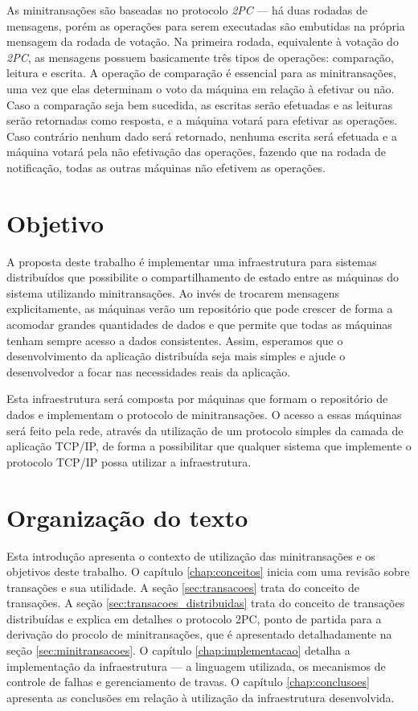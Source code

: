 \documentclass[11pt,twoside,a4paper]{book}
\begin{document}
As minitransações são baseadas no protocolo \emph{2PC} --- há duas rodadas de mensagens, porém as operações para serem executadas são embutidas na própria mensagem da rodada de votação. Na primeira rodada, equivalente à votação do \emph{2PC}, as mensagens possuem basicamente três tipos de operações: comparação, leitura e escrita. A operação de comparação é essencial para as minitransações, uma vez que elas determinam o voto da máquina em relação à efetivar ou não. Caso a comparação seja bem sucedida, as escritas serão efetuadas e as leituras serão retornadas como resposta, e a máquina votará para efetivar as operações. Caso contrário nenhum dado será retornado, nenhuma escrita será efetuada e a máquina votará pela não efetivação das operações, fazendo que na rodada de notificação, todas as outras máquinas não efetivem as operações.

\section{Objetivo}
\label{sec:objetivo}
A proposta deste trabalho é implementar uma infraestrutura para sistemas distribuídos que possibilite o compartilhamento de estado entre as máquinas do sistema utilizando minitransações. Ao invés de trocarem mensagens explicitamente, as máquinas verão um repositório que pode crescer de forma a acomodar grandes quantidades de dados e que permite que todas as máquinas tenham sempre acesso a dados consistentes. Assim, esperamos que o desenvolvimento da aplicação distribuída seja mais simples e ajude o desenvolvedor a focar nas necessidades reais da aplicação.

Esta infraestrutura será composta por máquinas que formam o repositório de dados e implementam o protocolo de minitransações. O acesso a essas máquinas será feito pela rede, através da utilização de um protocolo simples da camada de aplicação TCP/IP, de forma a possibilitar que qualquer sistema que implemente o protocolo TCP/IP possa utilizar a infraestrutura.

\section{Organização do texto}
\label{sec:organizacao_do_texto}
Esta introdução apresenta o contexto de utilização das minitransações e os objetivos deste trabalho. O capítulo \ref{chap:conceitos} inicia com uma revisão sobre transações e sua utilidade. A seção \ref{sec:transacoes} trata do conceito de transações. A seção \ref{sec:transacoes_distribuidas} trata do conceito de transações distribuídas e explica em detalhes o protocolo 2PC, ponto de partida para a derivação do procolo de minitransações, que é apresentado detalhadamente na seção \ref{sec:minitransacoes}. O capítulo \ref{chap:implementacao} detalha a implementação da infraestrutura --- a linguagem utilizada, os mecanismos de controle de falhas e gerenciamento de travas. O capítulo \ref{chap:conclusoes} apresenta as conclusões em relação à utilização da infraestrutura desenvolvida.
\end{document}
